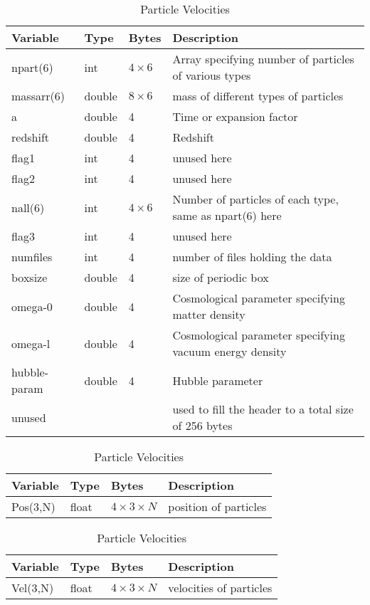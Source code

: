 \documentclass{article}
\begin{document}
\begin{table}[here]
\caption{Header}
\begin{tabular}{|p{1.5cm}|p{1.5cm}|p{1.5cm}|p{6cm}|}
\hline
\hline
  Variable     &  Type   &   Bytes & Description\\
\hline
npart(6) & int & $4\times6$ & Array specifying number of particles of various types\\
massarr(6) & double & $8\times6$ & mass of different types of particles\\
a & double & 4 & Time or expansion factor\\
redshift & double & 4 & Redshift\\
flag1 & int & 4 & unused here \\
flag2 & int & 4 & unused here \\
nall(6) & int & $4\times6$ & Number of particles of each type, same as npart(6) here\\
flag3 & int & 4 & unused here \\
numfiles & int & 4 & number of files holding the data \\
boxsize & double & 4 & size of periodic box\\
omega-0 & double & 4 & Cosmological parameter specifying matter density \\
omega-l & double & 4 &  Cosmological parameter specifying vacuum energy density\\
hubble-param & double & 4 & Hubble parameter \\
unused &  &  & used to fill the header to a total size of 256 bytes \\
\hline
\end{tabular}
  \caption{Particle Positions}
  \begin{tabular}{|p{1.5cm}|p{1.5cm}|p{1.5cm}|p{6cm}|}
\hline
\hline
  Variable     &  Type   &   Bytes & Description\\
\hline
Pos(3,N) & float & $4 \times 3 \times N$ & position of particles\\
\hline
\end{tabular}
  \caption{Particle Velocities}
  \begin{tabular}{|p{1.5cm}|p{1.5cm}|p{1.5cm}|p{6cm}|}
\hline
\hline
  Variable     &  Type   &   Bytes & Description\\
\hline
Vel(3,N) & float & $4 \times 3 \times N$ & velocities of particles\\
\hline
\end{tabular}
\end{table}
\end{document}
